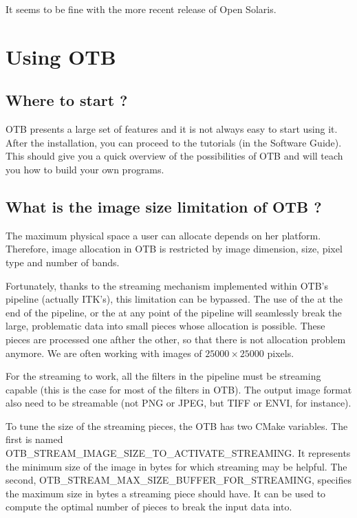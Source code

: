 It seems to be fine with the more recent release of Open Solaris.

\section{Using OTB}

\subsection{Where to start ?}

OTB presents a large set of features and it is not always easy to start using it.
After the installation, you can proceed to the tutorials (in the Software Guide).
This should give you a quick overview of the possibilities of OTB and will teach
you how to build your own programs.

\subsection{What is the image size limitation of OTB ?}

The maximum physical space a user can allocate depends on her platform. Therefore,
image allocation in OTB is restricted by image dimension, size, pixel type and number
of bands.

Fortunately, thanks to the streaming mechanism implemented within
OTB's pipeline (actually ITK's), this limitation can be bypassed. The
use of the  at the end of the pipeline,
or the  at any point of the pipeline will
seamlessly break the large, problematic data into small pieces whose
allocation is possible. These pieces are processed one afther the
other, so that there is not allocation problem anymore. We are often working with
images of $25000 \times 25000$ pixels.

For the streaming to work, all the filters in the pipeline must be streaming capable
(this is the case for most of the filters in OTB). The output image format also need to be
streamable (not PNG or JPEG, but TIFF or ENVI, for instance).

To tune the size of the streaming pieces, the OTB has
two CMake variables. The first is named
OTB\_STREAM\_IMAGE\_SIZE\_TO\_ACTIVATE\_STREAMING. It represents the
minimum size of the image in bytes for which streaming may be helpful. The
second, OTB\_STREAM\_MAX\_SIZE\_BUFFER\_FOR\_STREAMING, specifies the
maximum size in bytes a streaming piece should have. It can be used to
compute the optimal number of pieces to break the input data into.

